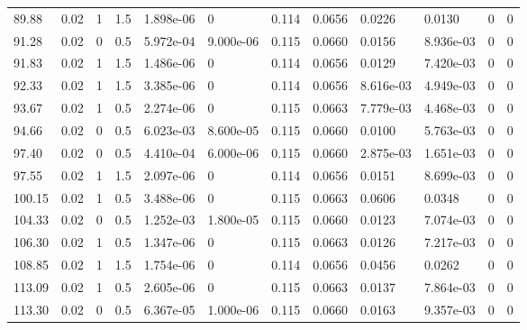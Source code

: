 \documentclass[preview]{standalone}
\begin{document}
{{\begin{tabular}{L{1.2cm}C{1.2cm} C{0.3cm}C{0.5cm} C{1.4cm}C{1.4cm} C{1.4cm}C{1.4cm} C{1.6cm}C{1.6cm} C{1.6cm}C{1.6cm}}
  89.88  &  0.02  & 1     & 1.5 &  1.898e-06  & 0  &  0.114&   0.0656& 0.0226 & 0.0130   &  0 & 0  \\ 
  91.28  &  0.02  & 0     & 0.5 &  5.972e-04  & 9.000e-06  &  0.115&   0.0660& 0.0156 & 8.936e-03   &  0 & 0  \\ 
  91.83  &  0.02  & 1     & 1.5 &  1.486e-06  & 0  &  0.114&   0.0656& 0.0129 & 7.420e-03   &  0 & 0  \\ 
  92.33  &  0.02  & 1     & 1.5 &  3.385e-06  & 0  &  0.114&   0.0656& 8.616e-03 & 4.949e-03   &  0 & 0  \\ 
  93.67  &  0.02  & 1     & 0.5 &  2.274e-06  & 0  &  0.115&   0.0663& 7.779e-03 & 4.468e-03   &  0 & 0  \\ 
  94.66  &  0.02  & 0     & 0.5 &  6.023e-03  & 8.600e-05  &  0.115&   0.0660& 0.0100 & 5.763e-03   &  0 & 0  \\ 
  97.40  &  0.02  & 0     & 0.5 &  4.410e-04  & 6.000e-06  &  0.115&   0.0660& 2.875e-03 & 1.651e-03   &  0 & 0  \\ 
  97.55  &  0.02  & 1     & 1.5 &  2.097e-06  & 0  &  0.114&   0.0656& 0.0151 & 8.699e-03   &  0 & 0  \\ 
  100.15  &  0.02  & 1     & 0.5 &  3.488e-06  & 0  &  0.115&   0.0663& 0.0606 & 0.0348   &  0 & 0  \\ 
  104.33  &  0.02  & 0     & 0.5 &  1.252e-03  & 1.800e-05  &  0.115&   0.0660& 0.0123 & 7.074e-03   &  0 & 0  \\ 
  106.30  &  0.02  & 1     & 0.5 &  1.347e-06  & 0  &  0.115&   0.0663& 0.0126 & 7.217e-03   &  0 & 0  \\ 
  108.85  &  0.02  & 1     & 1.5 &  1.754e-06  & 0  &  0.114&   0.0656& 0.0456 & 0.0262   &  0 & 0  \\ 
  113.09  &  0.02  & 1     & 0.5 &  2.605e-06  & 0  &  0.115&   0.0663& 0.0137 & 7.864e-03   &  0 & 0  \\ 
  113.30  &  0.02  & 0     & 0.5 &  6.367e-05  & 1.000e-06  &  0.115&   0.0660& 0.0163 & 9.357e-03   &  0 & 0  \\ 
\hline 
\end{tabular} 

}}
\end{document}
